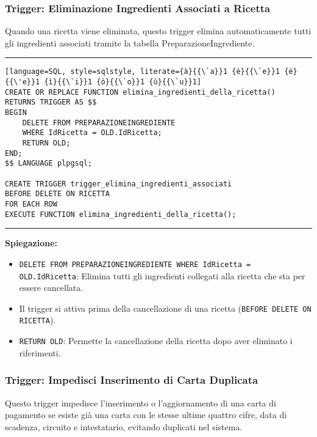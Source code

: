 \subsubsection{Trigger: Eliminazione Ingredienti Associati a Ricetta}

Quando una ricetta viene eliminata, questo trigger elimina automaticamente tutti gli ingredienti associati tramite la tabella PreparazioneIngrediente.

\noindent\rule{\textwidth}{0.4pt}
\begin{lstlisting}[language=SQL, style=sqlstyle, literate={à}{{\`a}}1 {è}{{\`e}}1 {é}{{\'e}}1 {ì}{{\`i}}1 {ò}{{\`o}}1 {ù}{{\`u}}1]
CREATE OR REPLACE FUNCTION elimina_ingredienti_della_ricetta()
RETURNS TRIGGER AS $$
BEGIN
    DELETE FROM PREPARAZIONEINGREDIENTE
    WHERE IdRicetta = OLD.IdRicetta;
    RETURN OLD;
END;
$$ LANGUAGE plpgsql;

CREATE TRIGGER trigger_elimina_ingredienti_associati
BEFORE DELETE ON RICETTA
FOR EACH ROW
EXECUTE FUNCTION elimina_ingredienti_della_ricetta();
\end{lstlisting}
\noindent\rule{\textwidth}{0.4pt}

\textbf{Spiegazione:}
\begin{itemize}
    \item \texttt{DELETE FROM PREPARAZIONEINGREDIENTE WHERE IdRicetta = OLD.IdRicetta}: Elimina tutti gli ingredienti collegati alla ricetta che sta per essere cancellata.
    \item Il trigger si attiva prima della cancellazione di una ricetta (\texttt{BEFORE DELETE ON RICETTA}).
    \item \texttt{RETURN OLD}: Permette la cancellazione della ricetta dopo aver eliminato i riferimenti.
\end{itemize}

\subsubsection{Trigger: Impedisci Inserimento di Carta Duplicata}

Questo trigger impedisce l'inserimento o l'aggiornamento di una carta di pagamento se esiste già una carta con le stesse ultime quattro cifre, data di scadenza, circuito e intestatario, evitando duplicati nel sistema.

